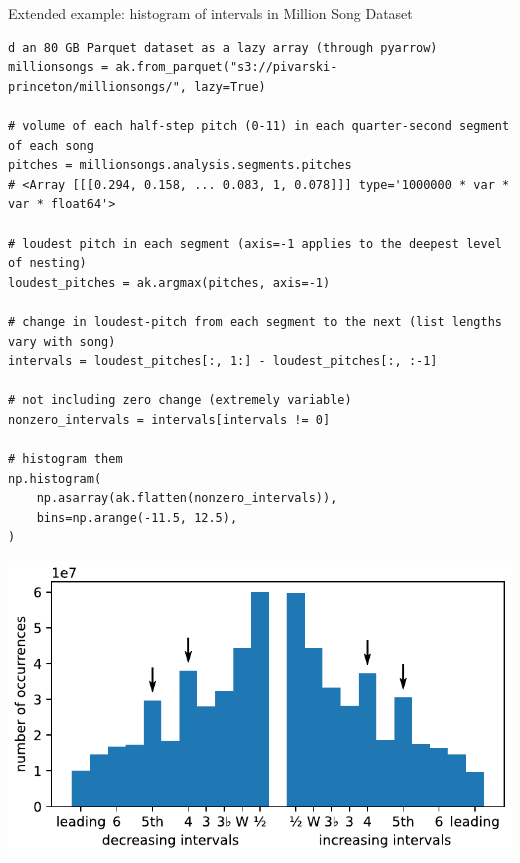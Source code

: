 \documentclass[aspectratio=169]{beamer}
\begin{document}
\begin{frame}[fragile]{Extended example: histogram of intervals in Million Song Dataset}
\begin{verbatim}
d an 80 GB Parquet dataset as a lazy array (through pyarrow)
millionsongs = ak.from_parquet("s3://pivarski-princeton/millionsongs/", lazy=True)

# volume of each half-step pitch (0-11) in each quarter-second segment of each song
pitches = millionsongs.analysis.segments.pitches
# <Array [[[0.294, 0.158, ... 0.083, 1, 0.078]]] type='1000000 * var * var * float64'>

# loudest pitch in each segment (axis=-1 applies to the deepest level of nesting)
loudest_pitches = ak.argmax(pitches, axis=-1)

# change in loudest-pitch from each segment to the next (list lengths vary with song)
intervals = loudest_pitches[:, 1:] - loudest_pitches[:, :-1]

# not including zero change (extremely variable)
nonzero_intervals = intervals[intervals != 0]

# histogram them
np.histogram(
    np.asarray(ak.flatten(nonzero_intervals)),
    bins=np.arange(-11.5, 12.5),
)
\end{verbatim}

\vspace{-2.95 cm}
\hfill \includegraphics[width=0.38\linewidth]{million-song-histogram.pdf}
\end{frame}
\end{document}
